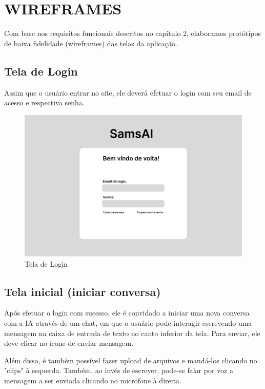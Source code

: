 \documentclass[
	12pt,				%
	openright,			%
	oneside,			    %
	a4paper,				%
	english,			%
	french,			%
	spanish,			%
	brazil			%
	]{abntex2}
\begin{document}
\chapter{WIREFRAMES} %
Com base nos requisitos funcionais descritos no capítulo 2, elaboramos protótipos de baixa fidelidade (wireframes) das telas da aplicação.

\section{Tela de Login}
Assim que o usuário entrar no site, ele deverá efetuar o login com seu email de acesso e respectiva senha.

\begin{figure}[h]
    \centering
    \includegraphics[width=0.8\linewidth]{Tela de Login.png}
    \caption{Tela de Login}
    \label{fig:enter-label}
\end{figure}

\section{Tela inicial (iniciar conversa)}
Após efetuar o login com sucesso, ele é convidado a iniciar uma nova conversa com a IA através de um chat, em que o usuário pode interagir escrevendo uma mensagem na caixa de entrada de texto no canto inferior da tela. Para enviar, ele deve clicar no ícone de enviar mensagem. 

Além disso, é também possível fazer upload de arquivos e mandá-los clicando no "clips" à esquerda. Também, ao invés de escrever, pode-se falar por voz a mensagem a ser enviada clicando no microfone à direita.
\end{document}
